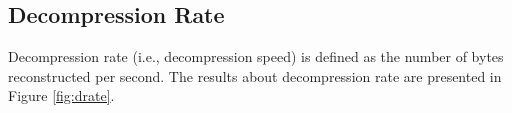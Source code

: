 \subsection{Decompression Rate}

Decompression rate (i.e., decompression speed) is defined as the number of bytes reconstructed per second.
The results about decompression rate are presented in Figure \ref{fig:drate}.

